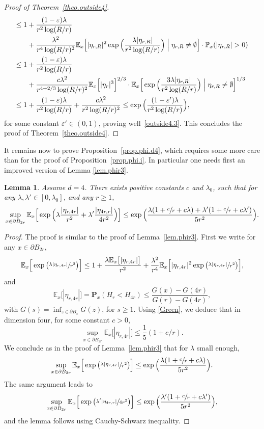 \documentclass[JEP,XML,SOM,Unicode,NoFloatCountersInSection,published]{cedram}
\theoremstyle{plain}
\newtheorem{lemma}[theorem]{Lemma}
\theoremstyle{definition}
\newcommand{\1}{{\text{\Large $\mathfrak 1$}}}
\begin{document}
\begin{proof}[Proof of Theorem~\ref{theo.outside4}]
\begin{align*}
\le 1&+\frac{(1-\varepsilon)\lambda}{r^2\log(R/r)}\\
&+ \frac{\lambda^2}{r^4\log(R/r)^2}
\mathbb E_x\Big[|\eta_{r,R}|^2\exp\Big(\frac{\lambda|\eta_{r,R}|}{r^2\log(R/r)}\Big)\Bigm| \eta_{r,R}\neq \emptyset\Big]\cdot \mathbb P_x(|\eta_{r,R}|>0) \\
\le 1&+\frac{(1-\varepsilon)\lambda}{r^2\log(R/r)}\\
&+ \frac{c\lambda^2}{r^{4+2/3}\log(R/r)^2}
\mathbb E_x\Big[|\eta_r|^3\Big]^{2/3} \cdot
\mathbb E_x\Big[\exp\Big(\frac{3\lambda|\eta_{r,R}|}{r^2\log(R/r)}\Big)\Bigm| \eta_{r,R}\neq \emptyset\Big]^{1/3}\\
\le 1&+\frac{(1-\varepsilon)\lambda}{r^2\log(R/r)} + \frac{c\lambda^2}{r^2\log(R/r)^2}\le \exp\Big(\frac{(1-\varepsilon')\lambda}{r^2\log (R/r)}\Big),
\end{align*}
for some constant $\varepsilon'\in(0,1)$, proving well~\eqref{outside4.3}. This concludes the proof of Theorem~\ref{theo.outside4}.
\end{proof}
It remains now to prove Proposition~\ref{prop.phi.d4}, which requires some more care than for the proof of Proposition~\ref{prop.phi.i}.
In particular one needs first an improved version of Lemma \ref{lem.phir3}.

\begin{lemma}\label{lem.phir4}
Assume $d=4$. There exists positive constants $c$ and $\lambda_0$, such that for any $\lambda, \lambda'\in[0,\lambda_0]$, and any $r\ge 1$,
\[
\sup_{x\in \partial B_{2r}} \mathbb E_x \Big[\exp\Big(\lambda\frac{|\eta_{r,4r}|}{r^2} +
\lambda' \frac{|\eta_{4r,r}|}{4r^2}\Big)\Big] \le \exp\Big(\frac{\lambda(1+\sfrac{c}{r}+c\lambda)+ \lambda'(1+\sfrac{c}{r}+c\lambda')}{5r^2}\Big).
\]
\end{lemma}
\begin{proof}
The proof is similar to the proof of Lemma~\ref{lem.phir3}. First we write for any $x\in \partial B_{2r}$,
\[
\mathbb E_x\Big[\exp\big(\sfrac{\lambda |\eta_{r,4r}|}{r^2}\big)\Big] \le 1+ \frac{\lambda \mathbb E_x\big[|\eta_{r,4r}|\big]}{r^2} +
\frac{\lambda^2}{r^4} \mathbb E_x\Big[|\eta_{r,4r}|^2\exp\big(\sfrac{\lambda |\eta_{r,4r}|}{r^2}\big)\Big],
\]
and
\[
\mathbb E_x\big[|\eta_{r,4r}|\big] = \mathbf P_x(H_r<H_{4r}) \le \frac{G(x) - G(4r)}{G(r)- G(4r)},
\]
with $G(s)= \inf_{z\in \partial B_s} G(z)$, for $s\ge 1$. Using \eqref{Green}, we deduce that in dimension four, for some constant $c>0$,
\[
\sup_{x\in \partial B_{2r}} \mathbb E_x\big[|\eta_{r,4r}|\big] \le \frac{1}{5} (1+ c/r).
\]
We conclude as in the proof of Lemma~\ref{lem.phir3} that for $\lambda$ small enough,
\[
\sup_{x\in \partial B_{2r}} \mathbb E_x\Big[\exp\big(\sfrac{\lambda |\eta_{r,4r}|}{r^2}\big)\Big] \le \exp\Big(\frac{\lambda(1+\sfrac{c}{r}+c\lambda)}{5r^2}\Big).
\]
The same argument leads to
\[
\sup_{x\in \partial B_{2r}} \mathbb E_x\Big[\exp\big(\sfrac{\lambda' |\eta_{4r,r}|}{4r^2}\big)\Big] \le \exp\Big(\frac{\lambda'(1+\sfrac{c}{r}+c\lambda')}{5r^2}\Big),
\]
and the lemma follows using Cauchy-Schwarz inequality.
\end{proof}
\end{document}
